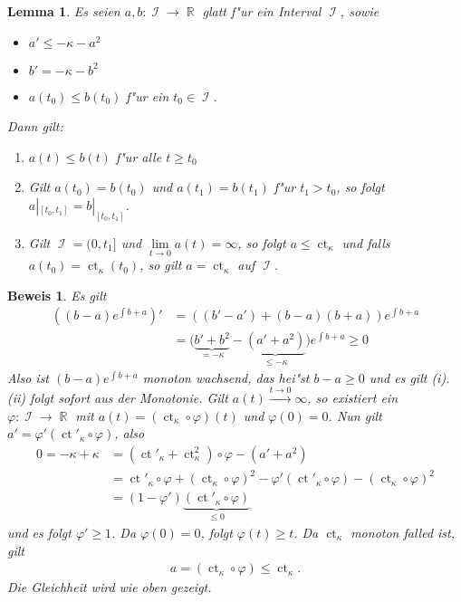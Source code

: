 \documentclass[paper=A4, twoside, chapterprefix=true, bibliography=totoc, headsepline]{scrbook}
\let\temp\phi{}
\let\phi\varphi{}
\let\varphi\temp{}
\let\temp\theta{}
\let\theta\vartheta{}
\let\vartheta\temp{}
\let\temp\epsilon{}
\let\epsilon\varepsilon{}
\let\varepsilon\temp{}
\let\temp\rho{}
\let\rho\varrho{}
\let\varrho\temp{}
\DeclareMathOperator{\R}{\mathbb{R}}
\DeclareMathOperator{\calI}{\mathcal{I}}
\DeclareMathOperator{\ct}{ct}       %
\theoremstyle{plain}
\newtheorem{Lemma}[Dfn]{Lemma}
\theoremstyle{nonumberplain}
\newtheorem{bew}{Beweis}
\theoremstyle{empty}
\theoremstyle{break}
\begin{document}
\begin{Lemma}\label{thm:lemma-9-16}
  Es seien $a,b \colon \calI \to \R$ glatt f"ur ein Interval $\calI$, sowie
  \begin{itemize}
  \item $a' \leq -\kappa - a^2$
  \item $b' = -\kappa - b^2$
  \item $a(t_0) \leq b(t_0)$ f"ur ein $t_0 \in \calI$.
  \end{itemize}
  Dann gilt:
  \begin{enumerate}[label=(\roman*)]
  \item $a(t) \leq b(t)$ f"ur alle $t \ge t_0$
  \item Gilt $a(t_0) = b(t_0)$ und $a(t_1) = b(t_1)$ f"ur $t_1 > t_0$, so folgt $a|_{[t_0,t_1]} = b|_{[t_0,t_1]}$.
  \item Gilt $\calI = (0,t_1]$ und $\lim\limits_{t \to 0}a(t) = \infty$, so folgt $a \leq \ct_{\kappa}$ und falls $a(t_0) = \ct_{\kappa}(t_0)$, so gilt $a = \ct_{\kappa}$ auf $\calI$.
  \end{enumerate}
\end{Lemma}

\begin{bew}
  Es gilt
  \begin{align*}
    \left((b-a)e^{\int b+a}\right)'
    & = \left((b'-a') + (b-a)(b+a)\right)e^{\int b+a} \\
    & = \big(\underbrace{b'+b^2}_{= -\kappa} - \underbrace{(a' + a^2)}_{\leq - \kappa}\big)e^{\int b+a}
    \geq 0
  \end{align*}
  Also ist $(b-a)e^{\int b+a}$ monoton wachsend, das hei"st $b-a \geq 0$ und es gilt (i). (ii) folgt sofort aus der Monotonie.
  Gilt $a(t) \xrightarrow{t\to 0} \infty$, so existiert ein $\phi \colon \calI \to \R$ mit $a(t) = (\ct_{\kappa}\circ \phi)(t)$ und $\phi(0) = 0$.
  Nun gilt $a' = \phi'(\ct'_{\kappa} \circ \phi)$, also
  \begin{align*}
    0 = -\kappa + \kappa
    & = (\ct'_{\kappa} + \ct_{\kappa}^2) \circ \phi - (a' + a^2)\\
    & = \ct'_{\kappa} \circ \phi + (\ct_{\kappa} \circ \phi)^2 - \phi'(\ct'_{\kappa} \circ \phi) - (\ct_{\kappa} \circ \phi)^2\\
    & = (1-\phi')\underbrace{(\ct'_{\kappa} \circ \phi)}_{\leq 0}
  \end{align*}
  und es folgt $\phi' \geq 1$.
  Da $\phi(0) = 0$, folgt $\phi(t) \geq t$.
  Da $\ct_{\kappa}$ monoton falled ist, gilt
  \begin{align*}
    a = (\ct_{\kappa} \circ \phi) \leq \ct_{\kappa}.
  \end{align*}
  Die Gleichheit wird wie oben gezeigt.
\end{bew}
\end{document}
